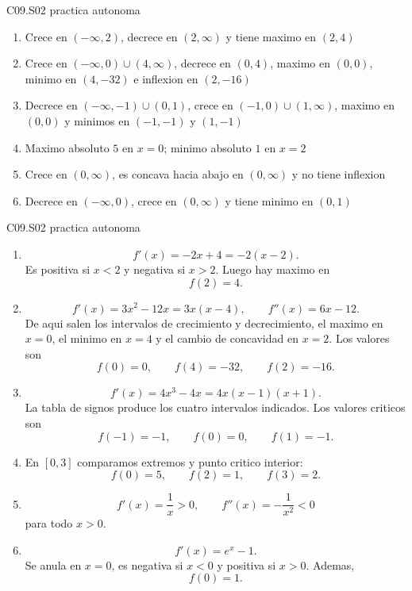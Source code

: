 \begin{shortanswer}{C09.S02 practica autonoma}
\begin{enumerate}[label=\textbf{PX-C09.S02-\arabic*:}, leftmargin=*]
  \item Crece en \((-\infty,2)\), decrece en \((2,\infty)\) y tiene maximo en \((2,4)\)
  \item Crece en \((-\infty,0)\cup(4,\infty)\), decrece en \((0,4)\), maximo en \((0,0)\),
  minimo en \((4,-32)\) e inflexion en \((2,-16)\)
  \item Decrece en \((-\infty,-1)\cup(0,1)\), crece en \((-1,0)\cup(1,\infty)\), maximo en
  \((0,0)\) y minimos en \((-1,-1)\) y \((1,-1)\)
  \item Maximo absoluto \(5\) en \(x=0\); minimo absoluto \(1\) en \(x=2\)
  \item Crece en \((0,\infty)\), es concava hacia abajo en \((0,\infty)\) y no tiene inflexion
  \item Decrece en \((-\infty,0)\), crece en \((0,\infty)\) y tiene minimo en \((0,1)\)
\end{enumerate}
\end{shortanswer}

\begin{fullsolution}{C09.S02 practica autonoma}
\begin{enumerate}[label=\textbf{PX-C09.S02-\arabic*:}, leftmargin=*]
  \item
  \[
  f'(x)=-2x+4=-2(x-2).
  \]
  Es positiva si \(x<2\) y negativa si \(x>2\). Luego hay maximo en
  \[
  f(2)=4.
  \]
  \item
  \[
  f'(x)=3x^2-12x=3x(x-4),\qquad f''(x)=6x-12.
  \]
  De aqui salen los intervalos de crecimiento y decrecimiento, el maximo en \(x=0\), el
  minimo en \(x=4\) y el cambio de concavidad en \(x=2\). Los valores son
  \[
  f(0)=0,\qquad f(4)=-32,\qquad f(2)=-16.
  \]
  \item
  \[
  f'(x)=4x^3-4x=4x(x-1)(x+1).
  \]
  La tabla de signos produce los cuatro intervalos indicados. Los valores criticos son
  \[
  f(-1)=-1,\qquad f(0)=0,\qquad f(1)=-1.
  \]
  \item En \([0,3]\) comparamos extremos y punto critico interior:
  \[
  f(0)=5,\qquad f(2)=1,\qquad f(3)=2.
  \]
  \item
  \[
  f'(x)=\frac{1}{x}>0,\qquad f''(x)=-\frac{1}{x^2}<0
  \]
  para todo \(x>0\).
  \item
  \[
  f'(x)=e^x-1.
  \]
  Se anula en \(x=0\), es negativa si \(x<0\) y positiva si \(x>0\). Ademas,
  \[
  f(0)=1.
  \]
\end{enumerate}
\end{fullsolution}

